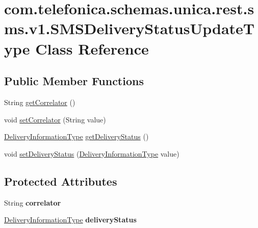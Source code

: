 \hypertarget{classcom_1_1telefonica_1_1schemas_1_1unica_1_1rest_1_1sms_1_1v1_1_1SMSDeliveryStatusUpdateType}{
\section{com.telefonica.schemas.unica.rest.sms.v1.SMSDeliveryStatusUpdateType Class Reference}
\label{classcom_1_1telefonica_1_1schemas_1_1unica_1_1rest_1_1sms_1_1v1_1_1SMSDeliveryStatusUpdateType}
}
\subsection*{Public Member Functions}
\begin{DoxyCompactItemize}
\item 
String \hyperlink{classcom_1_1telefonica_1_1schemas_1_1unica_1_1rest_1_1sms_1_1v1_1_1SMSDeliveryStatusUpdateType_ade034d2bf8bfd0fef0e5dd824d5bab84}{getCorrelator} ()
\item 
void \hyperlink{classcom_1_1telefonica_1_1schemas_1_1unica_1_1rest_1_1sms_1_1v1_1_1SMSDeliveryStatusUpdateType_ad741ad2c83c1a989c050e24ab91748f3}{setCorrelator} (String value)
\item 
\hyperlink{classcom_1_1telefonica_1_1schemas_1_1unica_1_1rest_1_1sms_1_1v1_1_1DeliveryInformationType}{DeliveryInformationType} \hyperlink{classcom_1_1telefonica_1_1schemas_1_1unica_1_1rest_1_1sms_1_1v1_1_1SMSDeliveryStatusUpdateType_ac1ee23e100201b6aafb4748c2bfb74c8}{getDeliveryStatus} ()
\item 
void \hyperlink{classcom_1_1telefonica_1_1schemas_1_1unica_1_1rest_1_1sms_1_1v1_1_1SMSDeliveryStatusUpdateType_a33e4a0835cd6efa30f97153664f36f3e}{setDeliveryStatus} (\hyperlink{classcom_1_1telefonica_1_1schemas_1_1unica_1_1rest_1_1sms_1_1v1_1_1DeliveryInformationType}{DeliveryInformationType} value)
\end{DoxyCompactItemize}
\subsection*{Protected Attributes}
\begin{DoxyCompactItemize}
\item 
\hypertarget{classcom_1_1telefonica_1_1schemas_1_1unica_1_1rest_1_1sms_1_1v1_1_1SMSDeliveryStatusUpdateType_a21ac908c32719164feee60088810f1df}{
String {\bfseries correlator}}
\label{classcom_1_1telefonica_1_1schemas_1_1unica_1_1rest_1_1sms_1_1v1_1_1SMSDeliveryStatusUpdateType_a21ac908c32719164feee60088810f1df}

\item 
\hypertarget{classcom_1_1telefonica_1_1schemas_1_1unica_1_1rest_1_1sms_1_1v1_1_1SMSDeliveryStatusUpdateType_a8f8fdc68151658bdd6bdab7d7a86cfde}{
\hyperlink{classcom_1_1telefonica_1_1schemas_1_1unica_1_1rest_1_1sms_1_1v1_1_1DeliveryInformationType}{DeliveryInformationType} {\bfseries deliveryStatus}}
\label{classcom_1_1telefonica_1_1schemas_1_1unica_1_1rest_1_1sms_1_1v1_1_1SMSDeliveryStatusUpdateType_a8f8fdc68151658bdd6bdab7d7a86cfde}

\end{DoxyCompactItemize}


